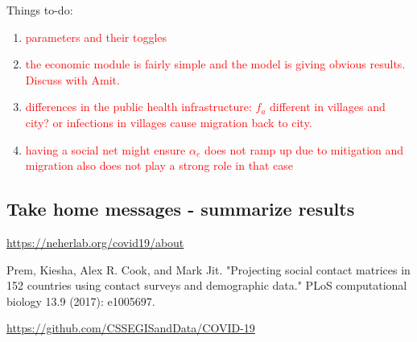 \documentclass{article}
\begin{document}
\pagebreak
Things to-do:

\begin{enumerate}
	\item \textcolor{red}{parameters and their toggles}
	
	\item \textcolor{red}{the economic module is fairly simple and the model is giving obvious results. Discuss with Amit.}
	
	\item \textcolor{red}{differences in the public health infrastructure: $f_a$ different in villages and city? or infections in villages cause migration back to city. }
	
	\item \textcolor{red}{having a social net might ensure $\alpha_e$ does not ramp up due to mitigation and migration also does not play a strong role in that case}
	
\end{enumerate}



\subsection{Take home messages - summarize results}

\begin{thebibliography}{10} 
	
	 \url{https://neherlab.org/covid19/about}

	 Prem, Kiesha, Alex R. Cook, and Mark Jit. "Projecting social contact matrices in 152 countries using contact surveys and demographic data." PLoS computational biology 13.9 (2017): e1005697.
	
	 \url{https://github.com/CSSEGISandData/COVID-19}
	
\end{thebibliography}
\end{document}
